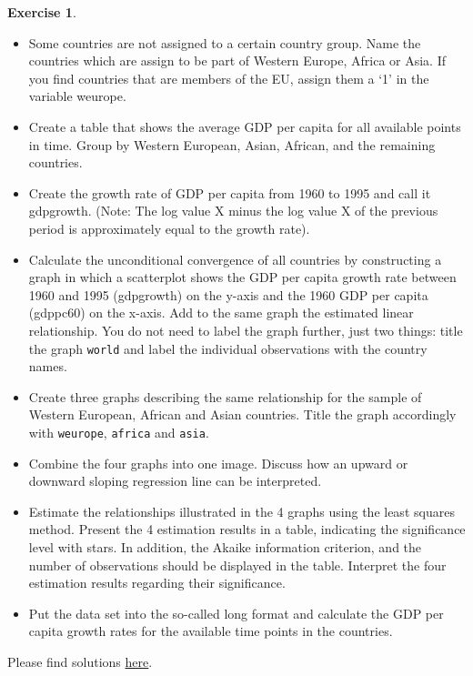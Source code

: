 \documentclass[
  12pt,
  oneside]{book}
\providecommand{\tightlist}{%
  \setlength{\itemsep}{0pt}\setlength{\parskip}{0pt}}
\theoremstyle{definition}
\theoremstyle{definition}
\theoremstyle{definition}
\newtheorem{exercise}{Exercise}[chapter]
\theoremstyle{definition}
\theoremstyle{remark}
\begin{document}
\begin{exercise}
\begin{itemize}
\tightlist
\item
  Some countries are not assigned to a certain country group. Name the countries which are assign to be part of Western Europe, Africa or Asia. If you find countries that are members of the EU, assign them a `1' in the variable weurope.
\item
  Create a table that shows the average GDP per capita for all available points in time. Group by Western European, Asian, African, and the remaining countries.
\item
  Create the growth rate of GDP per capita from 1960 to 1995 and call it gdpgrowth. (Note: The log value X minus the log value X of the previous period is approximately equal to the growth rate).
\item
  Calculate the unconditional convergence of all countries by constructing a graph in which a scatterplot shows the GDP per capita growth rate between 1960 and 1995 (gdpgrowth) on the y-axis and the 1960 GDP per capita (gdppc60) on the x-axis. Add to the same graph the estimated linear relationship. You do not need to label the graph further, just two things: title the graph \texttt{world} and label the individual observations with the country names.
\item
  Create three graphs describing the same relationship for the sample of Western European, African and Asian countries. Title the graph accordingly with \texttt{weurope}, \texttt{africa} and \texttt{asia}.
\item
  Combine the four graphs into one image. Discuss how an upward or downward sloping regression line can be interpreted.
\item
  Estimate the relationships illustrated in the 4 graphs using the least squares method. Present the 4 estimation results in a table, indicating the significance level with stars. In addition, the Akaike information criterion, and the number of observations should be displayed in the table. Interpret the four estimation results regarding their significance.
\item
  Put the data set into the so-called long format and calculate the GDP per capita growth rates for the available time points in the countries.
\end{itemize}

Please find solutions \href{https://raw.githubusercontent.com/hubchev/courses/main/scr/convergence.R}{here}.
\end{exercise}
\end{document}
